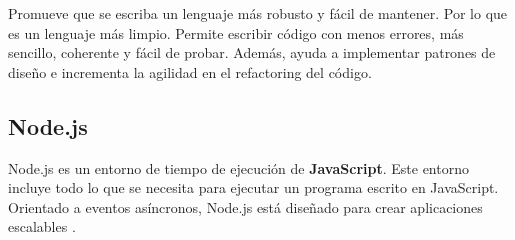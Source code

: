 \documentclass[12pt,twoside,titlepage]{report}
\begin{document}

Promueve que se escriba un lenguaje más robusto y fácil de mantener. Por lo que es un lenguaje más limpio. Permite escribir código con menos errores, más sencillo, coherente y fácil de probar. Además, ayuda a implementar patrones de diseño e incrementa la agilidad en el refactoring del código.
\cite{typescript2}

\subsection{Node.js}
\label{sec:Node}

Node.js es un entorno de tiempo de ejecución de \textbf{JavaScript}. Este entorno incluye todo lo que se necesita para ejecutar un programa escrito en JavaScript. Orientado a eventos asíncronos, Node.js está diseñado para crear aplicaciones escalables \cite{node}.

\end{document}
